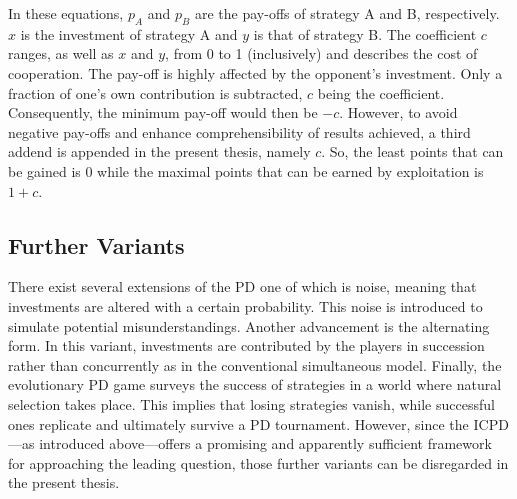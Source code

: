 \documentclass[11pt]{article}
\begin{document}
\noindent
In these equations, $p_A$ and $p_B$ are the pay-offs of strategy A and B, respectively.
$x$ is the investment of strategy A and $y$ is that of strategy B.
The coefficient $c$ ranges, as well as $x$ and $y$, from 0 to 1 (inclusively) and describes the cost of cooperation.
The pay-off is highly affected by the opponent's investment.
Only a fraction of one's own contribution is subtracted, $c$ being the coefficient.
Consequently, the minimum pay-off would then be $-c$.
However, to avoid negative pay-offs and enhance comprehensibility of results achieved, a third addend is appended in the present thesis, namely $c$.
So, the least points that can be gained is 0 while the maximal points that can be earned by exploitation is $1 + c$.



\subsection{Further Variants}

There exist several extensions of the PD one of which is noise, meaning that investments are altered with a certain probability.
This noise is introduced to simulate potential misunderstandings.
Another advancement is the alternating form.
In this variant, investments are contributed by the players in succession rather than concurrently as in the conventional simultaneous model.
Finally, the evolutionary PD game surveys the success of strategies in a world where natural selection takes place.
This implies that losing strategies vanish, while successful ones replicate and ultimately survive a PD tournament.
However, since the ICPD---as introduced above---offers a promising and apparently sufficient framework for approaching the leading question, those further variants can be disregarded in the present thesis.
\end{document}
